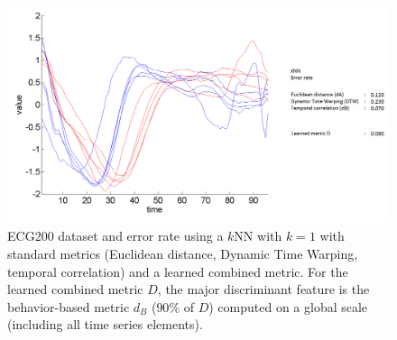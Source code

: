 \begin{figure}[h!]
\centering
\includegraphics[width=0.7\linewidth]{images/ECG2002}
\caption{ECG200 dataset and error rate using a $k$NN with $k=1$ with standard metrics (Euclidean distance, Dynamic Time Warping, temporal correlation) and a learned combined metric. For the learned combined metric $D$, the major discriminant feature is the behavior-based metric $d_B$ ($90\%$ of $D$) computed on a global scale (including all time series elements).}
\label{fig:ECG200}
\end{figure}






